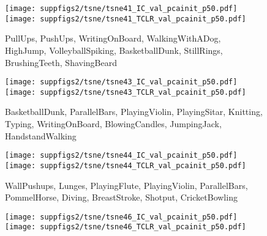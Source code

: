 \documentclass[10pt,twocolumn,letterpaper]{article}
\begin{document}
\begin{figure*}[h!]
\begin{subfigure}[t]{0.49\textwidth}
\end{subfigure}
\begin{subfigure}[t]{0.49\textwidth}
    \texttt{[image: suppfigs2/tsne/tsne41\_IC\_val\_pcainit\_p50.pdf]}
    \texttt{[image: suppfigs2/tsne/tsne41\_TCLR\_val\_pcainit\_p50.pdf]}
    \caption{\textcolor{c0}{PullUps}, \textcolor{c1}{PushUps}, \textcolor{c2}{WritingOnBoard}, \textcolor{c3}{WalkingWithADog}, \textcolor{c4}{HighJump}, \textcolor{c5}{VolleyballSpiking}, \textcolor{c6}{BasketballDunk}, \textcolor{c7}{StillRings}, \textcolor{c8}{BrushingTeeth}, \textcolor{c9}{ShavingBeard}}
\end{subfigure}
\hfill \begin{subfigure}[t]{0.49\textwidth}
    \texttt{[image: suppfigs2/tsne/tsne43\_IC\_val\_pcainit\_p50.pdf]}
    \texttt{[image: suppfigs2/tsne/tsne43\_TCLR\_val\_pcainit\_p50.pdf]}
    \caption{\textcolor{c0}{BasketballDunk}, \textcolor{c1}{ParallelBars}, \textcolor{c2}{PlayingViolin}, \textcolor{c3}{PlayingSitar}, \textcolor{c4}{Knitting}, \textcolor{c5}{Typing}, \textcolor{c6}{WritingOnBoard}, \textcolor{c7}{BlowingCandles}, \textcolor{c8}{JumpingJack}, \textcolor{c9}{HandstandWalking}}
\end{subfigure}
\begin{subfigure}[t]{0.49\textwidth}
    \texttt{[image: suppfigs2/tsne/tsne44\_IC\_val\_pcainit\_p50.pdf]}
    \texttt{[image: suppfigs2/tsne/tsne44\_TCLR\_val\_pcainit\_p50.pdf]}
    \caption{\textcolor{c0}{WallPushups}, \textcolor{c1}{Lunges}, \textcolor{c2}{PlayingFlute}, \textcolor{c3}{PlayingViolin}, \textcolor{c4}{ParallelBars}, \textcolor{c5}{PommelHorse}, \textcolor{c6}{Diving}, \textcolor{c7}{BreastStroke}, \textcolor{c8}{Shotput}, \textcolor{c9}{CricketBowling}}
\end{subfigure}
\hfill \begin{subfigure}[t]{0.49\textwidth}
    \texttt{[image: suppfigs2/tsne/tsne46\_IC\_val\_pcainit\_p50.pdf]}
    \texttt{[image: suppfigs2/tsne/tsne46\_TCLR\_val\_pcainit\_p50.pdf]}
    

\end{subfigure}
\end{figure*}
\end{document}
